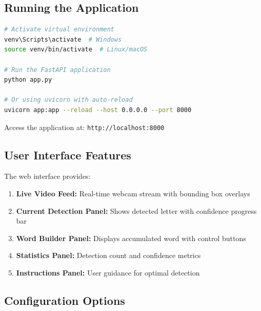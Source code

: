 \documentclass[12pt,a4paper]{article}
\begin{document}
\subsection{Running the Application}

\begin{lstlisting}[language=bash, caption=Starting the Web Server]
# Activate virtual environment
venv\Scripts\activate  # Windows
source venv/bin/activate  # Linux/macOS

# Run the FastAPI application
python app.py

# Or using uvicorn with auto-reload
uvicorn app:app --reload --host 0.0.0.0 --port 8000
\end{lstlisting}

Access the application at: \texttt{http://localhost:8000}

\subsection{User Interface Features}

The web interface provides:

\begin{enumerate}
    \item \textbf{Live Video Feed:} Real-time webcam stream with bounding box overlays
    \item \textbf{Current Detection Panel:} Shows detected letter with confidence progress bar
    \item \textbf{Word Builder Panel:} Displays accumulated word with control buttons
    \item \textbf{Statistics Panel:} Detection count and confidence metrics
    \item \textbf{Instructions Panel:} User guidance for optimal detection
\end{enumerate}

\subsection{Configuration Options}
\end{document}
